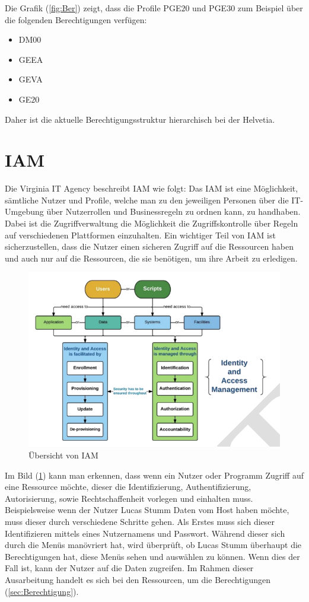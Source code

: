 \newpage
Die Grafik (\ref{fig:Ber}) zeigt, dass die Profile PGE$20$ und PGE$30$ zum Beispiel über die folgenden Berechtigungen verfügen:
\begin{itemize}
	\item DM$00$
	\item GEEA
	\item GEVA
	\item GE$20$
\end{itemize}
Daher ist die aktuelle Berechtigungsstruktur hierarchisch bei der Helvetia.


\section{IAM}
\label{subsec:IAM}
Die Virginia IT Agency beschreibt IAM wie folgt: Das \ac{IAM} ist eine Möglichkeit, sämtliche Nutzer und Profile, welche man zu den jeweiligen Personen über die IT-Umgebung über Nutzerrollen und Businessregeln zu ordnen kann, zu handhaben. Dabei ist die Zugriffverwaltung die Möglichkeit die Zugriffskontrolle über Regeln auf verschiedenen Plattformen einzuhalten. Ein wichtiger Teil von \ac{IAM} ist sicherzustellen, dass die Nutzer einen sicheren Zugriff auf die Ressourcen haben und auch nur auf die Ressourcen, die sie benötigen, um ihre Arbeit zu erledigen. \cite{Virg07}
\begin{figure}[h!]
 \centering
 \includegraphics[width=1\textwidth]{gfx/Picture/IAM.PNG}
 \caption{Übersicht von IAM \cite{Moha19}}
 \label{fig:IAM}
\end{figure}
Im Bild (\ref{fig:IAM}) kann man erkennen, dass wenn ein Nutzer oder Programm Zugriff auf eine Ressource möchte, dieser die Identifizierung, Authentifizierung, Autorisierung, sowie Rechtschaffenheit vorlegen und einhalten muss. \cite{Moha19}
Beispielsweise wenn der Nutzer Lucas Stumm Daten vom Host haben möchte, muss dieser durch verschiedene Schritte gehen.
Als Erstes muss sich dieser Identifizieren mittels eines Nutzernamens und Passwort.
Während dieser sich durch die Menüs manövriert hat, wird überprüft, ob Lucas Stumm überhaupt die Berechtigungen hat, diese Menüs sehen und auswählen zu können.
Wenn dies der Fall ist, kann der Nutzer auf die Daten zugreifen.
\newline
Im Rahmen dieser Ausarbeitung handelt es sich bei den Ressourcen, um die Berechtigungen (\ref{sec:Berechtigung}).
